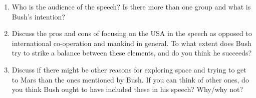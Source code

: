 \documentclass[10pt,a4paper,table]{article}
\begin{document}
\begin{enumerate}
  \item Who is the audience of the speech? Is there more than one group and what is Bush’s intention?

  \item Discuss the pros and cons of focusing on the USA in the speech as opposed to international co-operation and mankind in general. To what extent does Bush try to strike a balance between these elements, and do you think he succeeds?

  \item Discuss if there might be other reasons for exploring space and trying to get to Mars than the ones mentioned by Bush. If you can think of other ones, do you think Bush ought to have included these in his speech? Why/why not?

\end{enumerate}
\end{document}
